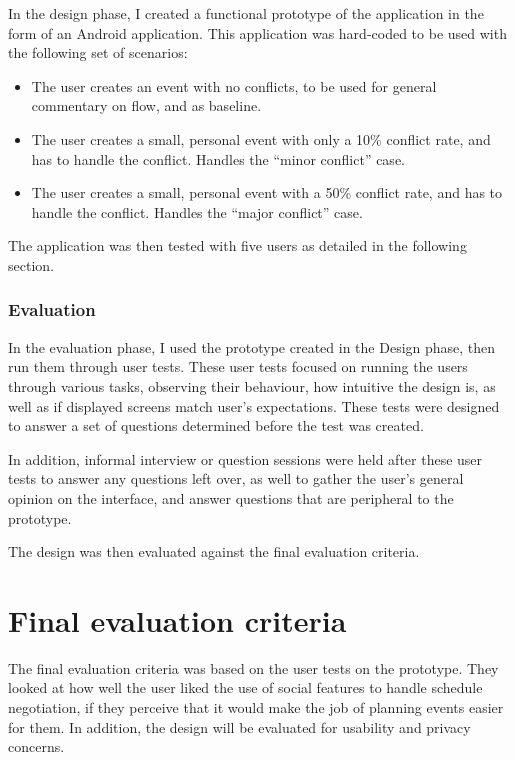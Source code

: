 \documentclass[]{report}
\begin{document}
In the design phase, I created a functional prototype of the application in the
form of an Android application. This application was hard-coded to be used with
the following set of scenarios:

\begin{itemize}
\item The user creates an event with no conflicts, to be used for general
  commentary on flow, and as baseline.
\item The user creates a small, personal event with only a 10\% conflict rate,
  and has to handle the conflict. Handles the ``minor conflict'' case.
\item The user creates a small, personal event with a 50\% conflict rate, and
  has to handle the conflict. Handles the ``major conflict'' case.
\end{itemize}

The application was then tested with five users as detailed in the following
section.

\subsubsection{Evaluation}

In the evaluation phase, I used the prototype created in the Design phase, then
run them through user tests. These user tests focused on running the users
through various tasks, observing their behaviour, how intuitive the design is,
as well as if displayed screens match user's expectations. These tests were
designed to answer a set of questions determined before the test was created.

In addition, informal interview or question sessions were held after these user
tests to answer any questions left over, as well to gather the user's general
opinion on the interface, and answer questions that are peripheral to the
prototype.

The design was then evaluated against the final evaluation criteria.

\section{Final evaluation criteria}

The final evaluation criteria was based on the user tests on the prototype. They
looked at how well the user liked the use of social features to handle schedule
negotiation, if they perceive that it would make the job of planning events
easier for them. In addition, the design will be evaluated for usability and
privacy concerns.
\end{document}
